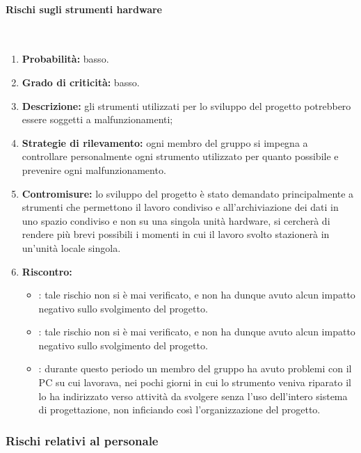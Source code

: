 \paragraph{Rischi sugli strumenti hardware}\mbox{}\\
\begin{enumerate}
	\item \textbf{Probabilità:} basso.
	\item \textbf{Grado di criticità:} basso.
	\item \textbf{Descrizione:} gli strumenti utilizzati per lo sviluppo del progetto potrebbero essere soggetti a malfunzionamenti;
	\item \textbf{Strategie di rilevamento:} ogni membro del gruppo si impegna a controllare personalmente ogni strumento utilizzato per quanto possibile e prevenire ogni malfunzionamento.
	\item \textbf{Contromisure:} lo sviluppo del progetto è stato demandato principalmente a strumenti che permettono il lavoro condiviso e all’archiviazione dei dati in uno spazio condiviso e non su una singola unità hardware, si cercherà di rendere più brevi possibili i momenti in cui il lavoro svolto stazionerà in un’unità locale singola.
	\item \textbf{Riscontro:} 
	\begin{itemize}
		\item \AR: tale rischio non si è mai verificato, e non ha dunque avuto alcun impatto negativo sullo svolgimento del progetto.
		\item \AD: tale rischio non si è mai verificato, e non ha dunque avuto alcun impatto negativo sullo svolgimento del progetto.
		\item \PA: durante questo periodo un membro del gruppo ha avuto problemi con il PC su cui lavorava, nei pochi giorni in cui lo strumento veniva riparato il \Responsabile{} lo ha indirizzato verso attività da svolgere senza l’uso dell’intero sistema di progettazione, non inficiando così l'organizzazione del progetto.
	\end{itemize}
\end{enumerate}

\subsubsection{Rischi relativi al personale}
